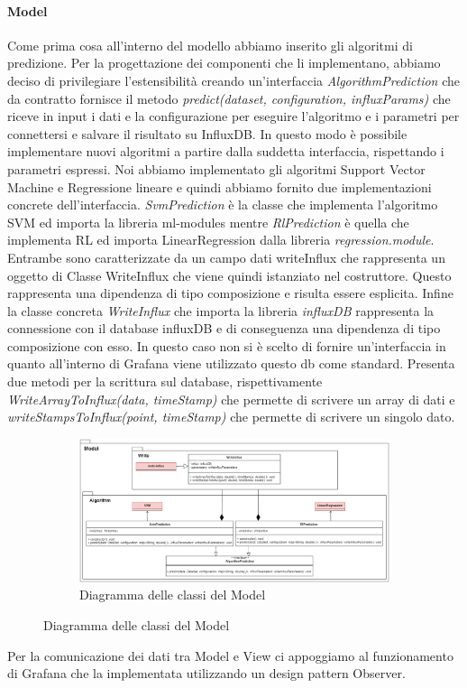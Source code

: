 			\paragraph{Model}
			Come prima cosa all'interno del modello abbiamo inserito gli algoritmi di predizione. Per la progettazione dei componenti che li implementano, abbiamo deciso di privilegiare l'estensibilità creando un'interfaccia \textit{AlgorithmPrediction} che da contratto fornisce il metodo \textit{predict(dataset, configuration, influxParams)} che riceve in input i dati e la configurazione per eseguire l'algoritmo e i parametri per connettersi e salvare il risultato su InfluxDB.
			In questo modo è possibile implementare nuovi algoritmi a partire dalla suddetta interfaccia, rispettando i parametri espressi. Noi abbiamo implementato gli algoritmi Support Vector Machine e Regressione lineare e quindi abbiamo fornito due implementazioni concrete dell'interfaccia.
			\textit{SvmPrediction} è la classe che implementa l'algoritmo SVM ed importa la libreria ml-modules mentre \textit{RlPrediction} è quella che implementa RL ed importa LinearRegression dalla libreria \textit{regression.module}. Entrambe sono caratterizzate da un campo dati writeInflux che rappresenta un oggetto di Classe WriteInflux che viene quindi istanziato nel costruttore. Questo rappresenta una dipendenza di tipo composizione e risulta essere esplicita. 
			Infine la classe concreta \textit{WriteInflux} che importa la libreria \textit{influxDB} rappresenta la connessione con il database influxDB e di conseguenza una dipendenza di tipo composizione con esso. In questo caso non si è scelto di fornire un'interfaccia in quanto all'interno di Grafana viene utilizzato questo db come standard. Presenta due metodi per la scrittura sul database, rispettivamente \textit{WriteArrayToInflux(data, timeStamp)} che permette di scrivere un array di dati e \textit{writeStampsToInflux(point, timeStamp)} che permette di scrivere un singolo dato. 
			\mbox{}
			\begin{landscape}
				\begin{figure}
					\begin{figure} [H]
						\includegraphics[width=\linewidth]{./img/Diagrammi/d1.png}
						\caption{Diagramma delle classi del Model}
					\end{figure}
				\end{figure}
			\end{landscape}
			Per la comunicazione dei dati tra Model e View ci appoggiamo al funzionamento di Grafana che la implementata utilizzando un design pattern Observer. 
